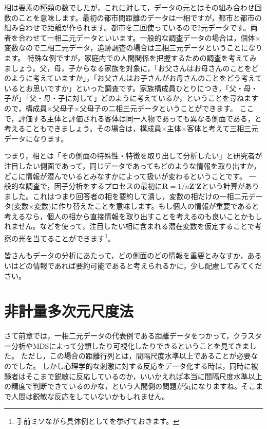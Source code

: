 \documentclass{ltjsbook}
\begin{document}
相は要素の種類の数でしたが，これに対して，データの元とはその組み合わせ回数のことを意味します。最初の都市間距離のデータは一相ですが，都市と都市の組み合わせで距離が作られます。都市を二回使っているので2元データです。両者を合わせて一相二元データといいます。一般的な調査データの場合は，個体$\times$変数なので二相二元データ，追跡調査の場合は三相三元データということになります。
特殊な例ですが，家庭内での人間関係を把握するための調査を考えてみましょう。父，母，子からなる家族を対象に，「お父さんはお母さんのことをどのように考えていますか」，「お父さんはお子さんがお母さんのことをどう考えているとお思いですか」といった調査です。家族構成員ひとりにつき，「父・母・子が」「父・母・子に対して」どのように考えているか，ということを尋ねますので，構成員$\times$父母子$\times$父母子の二相三元データということができます。
ここで，評価する主体と評価される客体は同一人物であっても異なる側面である，と考えることもできましょう。その場合は，構成員$\times$主体$\times$客体と考えて三相三元データになります。

つまり，相とは「その側面の特殊性・特徴を取り出して分析したい」と研究者が注目したい側面であって，同じデータであってもどのような情報を取り出すか，どこに情報が潜んでいるとみなすかによって扱いが変わるということです。
一般的な調査で，因子分析をするプロセスの最初に$\bm{R} = 1/n\bm{Z'Z}$という計算がありました。これはつまり回答者の相を要約して潰し，変数の相だけの一相二元データ(変数$\times$変数)に作り替えたことを意味します。もし個人の情報が重要であると考えるなら，個人の相から直接情報を取り出すことを考えるのも良いことかもしれません。などを使って，注目したい相に含まれる潜在変数を仮定することで考察の光を当てることができます\footnote{手前ミソながら具体例として\textcite{kosugi2011}を挙げておきます。}。

皆さんもデータの分析にあたって，どの側面のどの情報を重要とみなすか，あるいはどの情報であれば要約可能であると考えられるかに，少し配慮してみてください。

\section{非計量多次元尺度法}

さて前章では，一相二元データの代表例である距離データをつかって，クラスター分析やMDSによって分類したり可視化したりできるということを見てきました。
ただし，この場合の距離行列とは，間隔尺度水準以上であることが必要なのでした。
しかし心理学的な刺激に対する反応をデータ化する時は，同時に被験者はそこまで鋭敏に反応しているのか，いいかえれば本当に間隔尺度水準以上の精度で判断できているのかな，という人間側の問題が気になりますね。そこまで人間は鋭敏な反応をしていないかもしれません。
\end{document}
